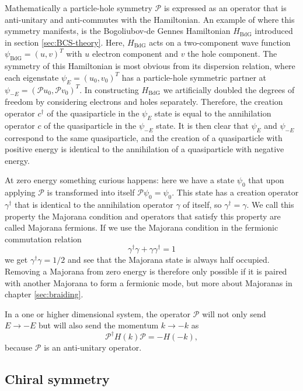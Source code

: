 Mathematically a particle-hole symmetry $\mathcal{P}$ is expressed as an operator that is anti-unitary and anti-commutes with the Hamiltonian.
An example of where this symmetry manifests, is the Bogoliubov-de Gennes Hamiltonian $H_{\textrm{BdG}}$ introduced in section \ref{sec:BCS-theory}.
Here, $H_{\textrm{BdG}}$ acts on a two-component wave function $\psi_{\textrm{BdG}}=\left(u,v\right)^{T}$ with $u$ electron component and $v$ the hole component.
The symmetry of this Hamiltonian is most obvious from its dispersion relation, where each eigenstate $\psi_{E}=\left(u_{0},v_{0}\right)^{T}$ has a particle-hole symmetric partner at $\psi_{-E}=\left(\mathcal{P}u_{0},\mathcal{P}v_{0}\right)^{T}$.
In constructing $H_{\textrm{BdG}}$ we artificially doubled the degrees of freedom by considering electrons and holes separately.
Therefore, the creation operator $c^{\dagger}$ of the quasiparticle in the $\psi_{E}$ state is equal to the annihilation operator $c$ of the quasiparticle in the $\psi_{-E}$ state.
It is then clear that $\psi_{E}$ and $\psi_{-E}$ correspond to the same quasiparticle, and the creation of a quasiparticle with positive energy is identical to the annihilation of a quasiparticle with negative energy.

At zero energy something curious happens: here we have a state $\psi_{0}$ that upon applying $\mathcal{P}$ is transformed into itself $\mathcal{P}\psi_{0}=\psi_{0}$.
This state has a creation operator $\gamma^{\dagger}$ that is identical to the annihilation operator $\gamma$ of itself, so $\gamma^{\dagger}=\gamma$.
We call this property the Majorana condition and operators that satisfy this property are called Majorana fermions.
If we use the Majorana condition in the fermionic commutation relation
\[
\gamma^{\dagger}\gamma+\gamma\gamma^{\dagger}=1
\]
we get $\gamma^{\dagger}\gamma=1/2$ and see that the Majorana state is always half occupied.
Removing a Majorana from zero energy is therefore only possible if it is paired with another Majorana to form a fermionic mode, but more about Majoranas in chapter \ref{sec:braiding}.

In a one or higher dimensional system, the operator $\mathcal{P}$ will not only send $E\rightarrow-E$ but will also send the momentum $k\rightarrow-k$ as
\[
\mathcal{P^{\dagger}}H\left(k\right)\mathcal{P}=-H\left(-k\right),
\]
because $\mathcal{P}$ is an anti-unitary operator.

\subsection{Chiral symmetry\label{sec:Chiral-symmetry}}

